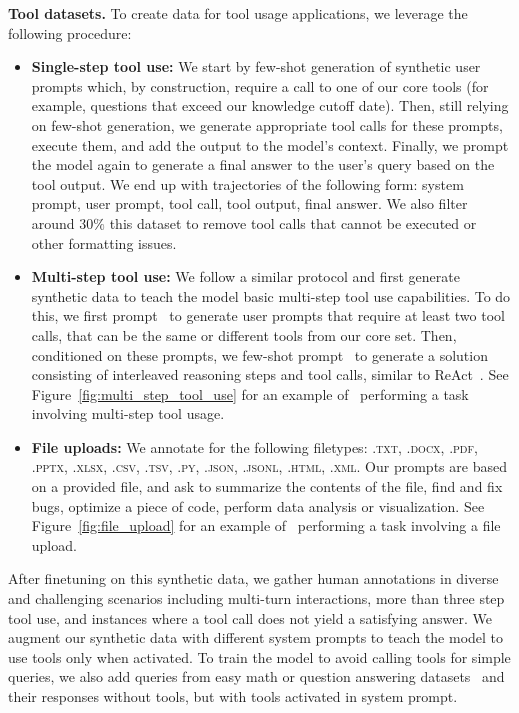 \textbf{Tool datasets.}
To create data for tool usage applications, we leverage the following procedure:
\begin{itemize}
    \item \textbf{Single-step tool use:} We start by few-shot generation of synthetic user prompts which, by construction, require a call to one of our core tools (for example, questions that exceed our knowledge cutoff date).
    Then, still relying on few-shot generation, we generate appropriate tool calls for these prompts, execute them, and add the output to the model's context. Finally, we prompt the model again to generate a final answer to the user's query based on the tool output. We end up with trajectories of the following form: system prompt, user prompt, tool call, tool output, final answer. We also filter around $30\%$ this dataset to remove tool calls that cannot be executed or other formatting issues. 
    
    \item \textbf{Multi-step tool use:} We follow a similar protocol and first generate synthetic data to teach the model basic multi-step tool use capabilities. To do this, we first prompt \llamathree~to generate user prompts that require at least two tool calls, that can be the same or different tools from our core set. Then, conditioned on these prompts, we few-shot prompt \llamathree~to generate a solution consisting of interleaved reasoning steps and tool calls, similar to ReAct~\citep{yao2022react}. See Figure~\ref{fig:multi_step_tool_use} for an example of \llamathree~performing a task involving multi-step tool usage. 
    
    \item \textbf{File uploads:} We annotate for the following filetypes: \textsc{.txt, .docx, .pdf, .pptx, .xlsx, .csv, .tsv, .py, .json, .jsonl, .html, .xml}. Our prompts are based on a provided file, and ask to summarize the contents of the file, find and fix bugs, optimize a piece of code, perform data analysis or visualization. See Figure~\ref{fig:file_upload} for an example of \llamathree~performing a task involving a file upload. 
\end{itemize}

After finetuning on this synthetic data, we gather human annotations in diverse and challenging scenarios including multi-turn interactions, more than three step tool use, and instances where a tool call does not yield a satisfying answer.
We augment our synthetic data with different system prompts to teach the model to use tools only when activated. To train the model to avoid calling tools for simple queries, we also add queries from easy math or question answering datasets~\citep{berant-etal-2013-semantic,koncel2016mawps,joshi-etal-2017-triviaqa,amini2019mathqa} and their responses without tools, but with tools activated in system prompt. 

